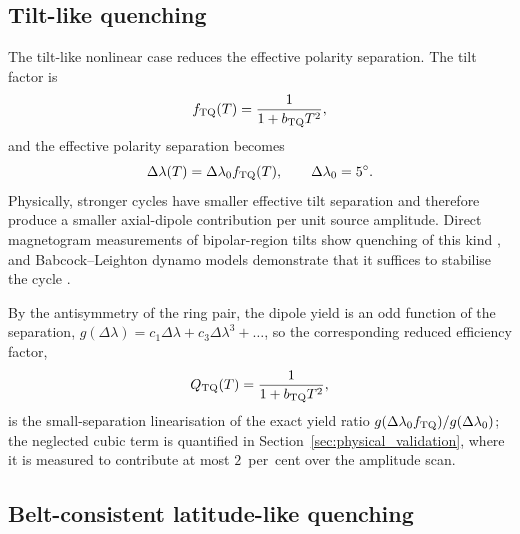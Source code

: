 \documentclass[namedreferences,hyperref,optionalrh,solaromanenum]{spr-sola}
\begin{document}
\subsection{Tilt-like quenching}
\label{subsec:tilt_quenching_equation}

The tilt-like nonlinear case reduces the effective polarity separation.
The tilt factor is
%
\begin{equation}
f_{\rm TQ}(T)
=
\frac{1}{1+b_{\rm TQ}T^2},
\label{eq:tilt_factor}
\end{equation}
%
and the effective polarity separation becomes
%
\begin{equation}
\Delta\lambda(T)
=
\Delta\lambda_0 f_{\rm TQ}(T),
\qquad
\Delta\lambda_0=5^\circ .
\label{eq:tilt_modified_sep}
\end{equation}
%
Physically, stronger cycles have smaller effective tilt separation and
therefore produce a smaller axial-dipole contribution per unit source
amplitude. Direct magnetogram measurements of bipolar-region tilts show
quenching of this kind \citep{Jha2020}, and Babcock--Leighton dynamo
models demonstrate that it suffices to stabilise the cycle
\citep{Lemerle2017,KarakMiesch2017}.

By the antisymmetry of the ring pair, the dipole yield is an odd function
of the separation, $g(\Delta\lambda)=c_1\Delta\lambda+c_3\Delta\lambda^3
+\dots$, so the corresponding reduced efficiency factor,
%
\begin{equation}
Q_{\rm TQ}(T)
=
\frac{1}{1+b_{\rm TQ}T^2},
\label{eq:QTQ}
\end{equation}
%
is the small-separation linearisation of the exact yield ratio
$g(\Delta\lambda_0f_{\rm TQ})/g(\Delta\lambda_0)$; the neglected cubic
term is quantified in Section~\ref{sec:physical_validation}, where it is
measured to contribute at most $2$~per~cent over the amplitude scan.

\subsection{Belt-consistent latitude-like quenching}
\label{subsec:lq_equation}
\end{document}
